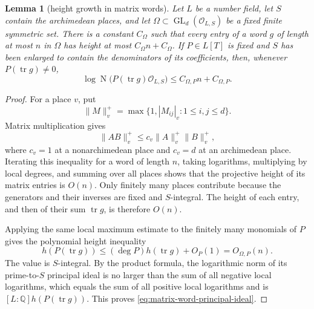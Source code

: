 \documentclass[11pt,reqno]{amsart}
\newtheorem{lemma}[theorem]{Lemma}
\theoremstyle{definition}
\theoremstyle{remark}
\newcommand{\Q}{\mathbb Q}
\newcommand{\cO}{\mathcal O}
\newcommand{\Tr}{\operatorname{tr}}
\newcommand{\GL}{\operatorname{GL}}
\newcommand{\Norm}{\operatorname{N}}
\begin{document}
\begin{lemma}[height growth in matrix words]
\label{lem:matrix-word-height}
Let \(L\) be a number field, let \(S\) contain the archimedean places, and
let \(\Omega\subset\GL_d(\cO_{L,S})\) be a fixed finite symmetric set.  There
is a constant \(C_\Omega\) such that every entry of a word \(g\) of length
at most \(n\) in \(\Omega\) has height at most
\(C_\Omega n+C_\Omega\).  If \(P\in L[T]\) is fixed and \(S\) has been
enlarged to contain the denominators of its coefficients, then, whenever
\(P(\Tr g)\ne0\),
\begin{equation}\label{eq:matrix-word-principal-ideal}
 \log\Norm\bigl(P(\Tr g)\cO_{L,S}\bigr)
 \le C_{\Omega,P}n+C_{\Omega,P}.
\end{equation}
\end{lemma}

\begin{proof}
For a place \(v\), put
\[
 \|M\|_v^+=\max\{1,|M_{ij}|_v:1\le i,j\le d\}.
\]
Matrix multiplication gives
\[
 \|AB\|_v^+\le c_v\|A\|_v^+\|B\|_v^+,
\]
where \(c_v=1\) at a nonarchimedean place and \(c_v=d\) at an
archimedean place.  Iterating this inequality for a word of length \(n\),
taking logarithms, multiplying by local degrees, and summing over all
places shows that the projective height of its matrix entries is \(O(n)\).
Only finitely many places contribute because the generators and their
inverses are fixed and \(S\)-integral.  The height of each entry, and then
of their sum \(\Tr g\), is therefore \(O(n)\).

Applying the same local maximum estimate to the finitely many monomials of
\(P\) gives the polynomial height inequality
\[
 h(P(\Tr g))\le(\deg P)h(\Tr g)+O_P(1)=O_{\Omega,P}(n).
\]
The value is \(S\)-integral.  By the product formula, the logarithmic norm
of its prime-to-\(S\) principal ideal is no larger than the sum of all
negative local logarithms, which equals the sum of all positive local
logarithms and is \([L:\Q]h(P(\Tr g))\).  This proves
\eqref{eq:matrix-word-principal-ideal}.
\end{proof}
\end{document}
